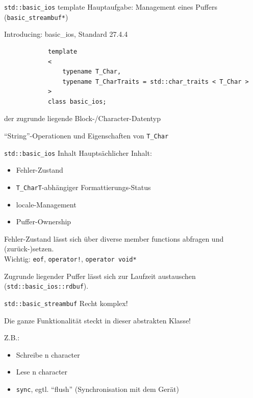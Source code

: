 \begin{frame}[fragile]{\texttt{std::basic\_ios} template}
	Hauptaufgabe: Management eines Puffers (\texttt{basic\_streambuf*})
	
	\vspace{2em}
	
	\begin{block}{Introducing: basic\_ios, Standard 27.4.4}
		\begin{lstlisting}
			template
			<
			    typename T_Char,
			    typename T_CharTraits = std::char_traits < T_Char >
			>
			class basic_ios;
		\end{lstlisting}
		
		\vspace{1em}
		
		\begin{description}[leftmargin=5em]
			\item[\texttt{T\_Char}] der zugrunde liegende Block-/Character-Datentyp
			\item[\texttt{T\_CharTraits}] \enquote{String}-Operationen und Eigenschaften von \texttt{T\_Char}
		\end{description}
	\end{block}
\end{frame}

\begin{frame}{\texttt{std::basic\_ios} Inhalt}
	Hauptsächlicher Inhalt:
	\begin{itemize}
		\item Fehler-Zustand
		\item \texttt{T\_CharT}-abhängiger Formattierungs-Status
		\item locale-Management
		\item Puffer-Ownership
	\end{itemize}
	
	\pause
	\vspace{2em}
	
	Fehler-Zustand lässt sich über diverse member functions abfragen und (zurück-)setzen.\\
	Wichtig: \texttt{eof}, \texttt{operator!}, \texttt{operator void*}
	
	\pause
	\vspace{2em}
	
	Zugrunde liegender Puffer lässt sich zur Laufzeit austauschen (\texttt{std::basic\_ios::rdbuf}).
\end{frame}

\begin{frame}{\texttt{std::basic\_streambuf}}
	Recht komplex!
	
	\pause
	\vspace{2em}
	
	Die ganze Funktionalität steckt in dieser abstrakten Klasse!
	
	Z.B.:
	\begin{itemize}
		\item Schreibe n character
		\item Lese n character
		\item \texttt{sync}, egtl. \enquote{flush} (Synchronisation mit dem Gerät)
	\end{itemize}
\end{frame}


